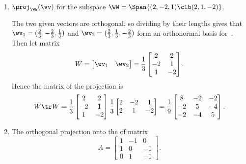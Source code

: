 \begin{example}
\begin{enumerate}
\item \(\proj_\WW(\vv)\) for the subspace \(\WW=\Span\{(2,-2,1)\clb (2,1,-2)\}\).
\begin{solution} 
The two given vectors are orthogonal, so dividing by their lengths gives that \(\wv_1=(\frac23,-\frac23,\frac13)\) and  \(\wv_2=(\frac23,\frac13,-\frac23)\) form an orthonormal basis for~\WW. 
Then let matrix
\begin{equation*}
W=\begin{bmatrix} \wv_1&\wv_2 \end{bmatrix}
=\frac13\begin{bmatrix} 2&2\\-2&1\\1&-2 \end{bmatrix}.
\end{equation*}
Hence the matrix of the projection is
\begin{equation*}
W\tr W
=\frac13\begin{bmatrix} 2&2\\-2&1\\1&-2 \end{bmatrix}
\frac13\begin{bmatrix} 2&-2&1\\ 2&1&-2\end{bmatrix}
=\frac19\begin{bmatrix} 8&-2&-2\\-2&5&-4\\-2&-4&5 \end{bmatrix}.
\end{equation*}
\end{solution}


\item The orthogonal projection onto the  of matrix
\begin{equation*}
A=\begin{bmatrix} 1&-1&0\\ 1&0&-1\\ 0&1&-1 \end{bmatrix}.
\end{equation*}


\end{enumerate}
\end{example}
